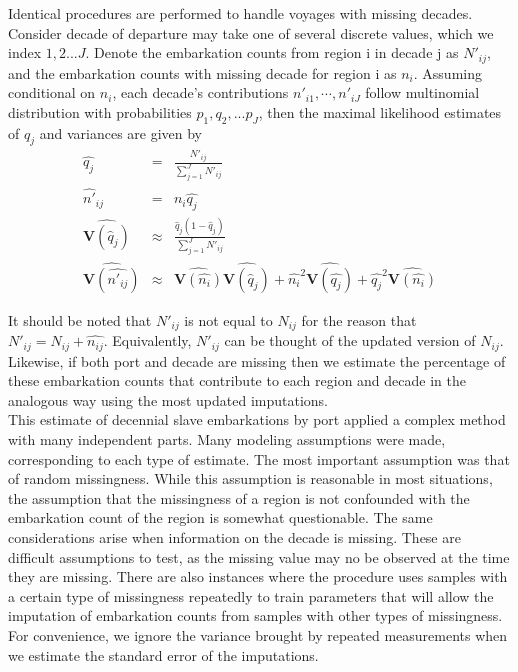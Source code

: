\documentclass[preprint,12pt]{elsarticle}
\begin{document}
Identical procedures are performed to handle voyages with missing decades.\\  

Consider decade of departure may take one of several discrete values, which we index $1,2...J$.
Denote the embarkation counts from region i in decade j as $N'_{ij}$,
 and the   embarkation counts with missing decade for region i as $n_i$. Assuming conditional on $n_i$,  each decade's contributions $n'_{i1},\cdots,n'_{iJ} $ follow multinomial distribution with probabilities $p_1,q_2,...p_J$, then the maximal likelihood estimates of $q_j$  and variances are 
given by
\begin{eqnarray}
\hat{q_j}&=&\frac{N'_{ij}}{\sum_{j=1} ^{J}{N'_{ij}}}\\
\hat{n'}_{ij}&=&n_i \hat{q_j} \\
\widehat{\mathbf{V}(\hat{q}_j)} &\approx& \frac{\hat{q}_j(1 - \hat{q}_j)}{\sum_{j=1} ^{J}{N'_{ij}}} \\
\widehat{\mathbf{V}(\hat{n'_{ij}})}&\approx& \widehat{\mathbf{V}(\hat{n_i})} \widehat{\mathbf{V}(\hat{q}_j)} + \hat{n_i}^2\widehat{\mathbf{V}(\hat{q_j})}+\hat{q_j}^2\widehat{\mathbf{V}(\hat{n_i})}
\end{eqnarray}
\par
It should be noted that $N'_{ij}$ is not equal to $N_{ij}$ for the reason that $N'_{ij}=N_{ij}+\hat{n_{ij}}$.
Equivalently,  $N'_{ij}$ can be thought of the updated version of $N_{ij}$.
Likewise, if both port and decade are missing then we estimate the percentage of these embarkation counts that contribute to each region and decade in the analogous way using the most updated imputations.\\

This estimate of decennial slave embarkations by port applied a complex method with many independent parts. Many modeling assumptions were made, corresponding to each type of estimate. The most important assumption was that of random missingness. While this assumption is reasonable in most situations, the assumption that the missingness of a region is not confounded with the embarkation count of the region is somewhat questionable. The same considerations arise when information on the decade is missing. These are difficult  assumptions to test, as the missing value may no be observed at the time they are missing. There are also instances where the procedure uses samples with a certain type of missingness repeatedly to train parameters that will allow the imputation of embarkation counts from samples with other types of missingness. For convenience, we ignore the variance brought by repeated measurements when we estimate the standard error of the imputations.\\
\end{document}
